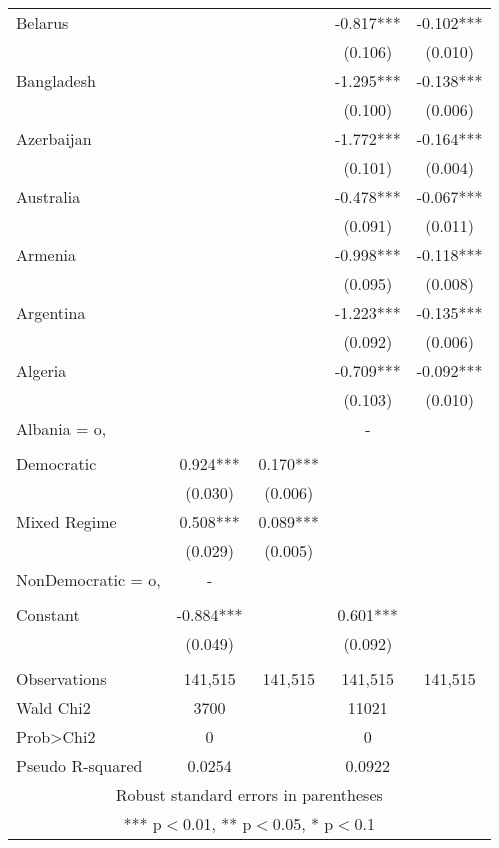 \documentclass[]{article}
\begin{document}
\begin{tabular}{lcccc}
Belarus &  &  & -0.817*** & -0.102*** \\
 &  &  & (0.106) & (0.010) \\
Bangladesh &  &  & -1.295*** & -0.138*** \\
 &  &  & (0.100) & (0.006) \\
Azerbaijan &  &  & -1.772*** & -0.164*** \\
 &  &  & (0.101) & (0.004) \\
Australia &  &  & -0.478*** & -0.067*** \\
 &  &  & (0.091) & (0.011) \\
Armenia &  &  & -0.998*** & -0.118*** \\
 &  &  & (0.095) & (0.008) \\
Argentina &  &  & -1.223*** & -0.135*** \\
 &  &  & (0.092) & (0.006) \\
Algeria &  &  & -0.709*** & -0.092*** \\
 &  &  & (0.103) & (0.010) \\
Albania = o, &  &  & - &  \\
 &  &  &  &  \\
Democratic & 0.924*** & 0.170*** &  &  \\
 & (0.030) & (0.006) &  &  \\
Mixed Regime & 0.508*** & 0.089*** &  &  \\
 & (0.029) & (0.005) &  &  \\
NonDemocratic = o, & - &  &  &  \\
 &  &  &  &  \\
Constant & -0.884*** &  & 0.601*** &  \\
 & (0.049) &  & (0.092) &  \\
 &  &  &  &  \\
Observations & 141,515 & 141,515 & 141,515 & 141,515 \\
Wald Chi2 & 3700 &  & 11021 &  \\
Prob>Chi2 & 0 &  & 0 &  \\
 Pseudo R-squared & 0.0254 &  & 0.0922 &  \\ \hline
\multicolumn{5}{c}{ Robust standard errors in parentheses} \\
\multicolumn{5}{c}{ *** p$<$0.01, ** p$<$0.05, * p$<$0.1} \\
\end{tabular}
\end{document}
